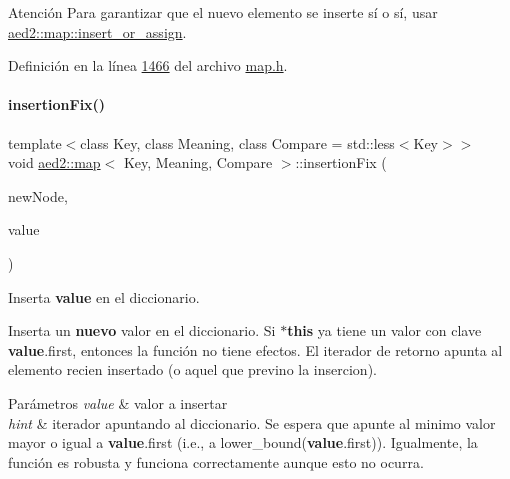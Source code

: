 \begin{DoxyAttention}{Atención}
Para garantizar que el nuevo elemento se inserte sí o sí, usar \hyperlink{classaed2_1_1map_a2ef6723c183916276b0afc4a4c721475_a2ef6723c183916276b0afc4a4c721475}{aed2\+::map\+::insert\+\_\+or\+\_\+assign}. 
\end{DoxyAttention}


Definición en la línea \hyperlink{map_8h_source_l01466}{1466} del archivo \hyperlink{map_8h_source}{map.\+h}.

\mbox{\label{classaed2_1_1map_abe3f47a745e17a6327943b813ff6bfb3_abe3f47a745e17a6327943b813ff6bfb3}} 
\paragraph{\texorpdfstring{insertion\+Fix()}{insertionFix()}}
{\footnotesize\ttfamily template$<$class Key, class Meaning, class Compare = std\+::less$<$\+Key$>$$>$ \\
void \hyperlink{classaed2_1_1map}{aed2\+::map}$<$ Key, Meaning, Compare $>$\+::insertion\+Fix (\begin{DoxyParamCaption}\item[{\hyperlink{structaed2_1_1map_1_1Node}{Node} $\ast$}]{new\+Node,  }\item[{const \hyperlink{classaed2_1_1map_a719db98e0ff9a837610f76be33264680_a719db98e0ff9a837610f76be33264680}{value\+\_\+type} \&}]{value }\end{DoxyParamCaption})\hspace{0.3cm}{\ttfamily [inline]}}



Inserta {\bfseries value} en el diccionario. 

Inserta un {\bfseries nuevo} valor en el diccionario. Si {\bfseries $\ast$this} ya tiene un valor con clave {\bfseries value}.first, entonces la función no tiene efectos. El iterador de retorno apunta al elemento recien insertado (o aquel que previno la insercion).


\begin{DoxyParams}{Parámetros}
{\em value} & valor a insertar \\
\hline
{\em hint} & iterador apuntando al diccionario. Se espera que apunte al minimo valor mayor o igual a {\bfseries value}.first (i.\+e., a lower\+\_\+bound({\bfseries value}.first)). Igualmente, la función es robusta y funciona correctamente aunque esto no ocurra. \\
\hline
\end{DoxyParams}

